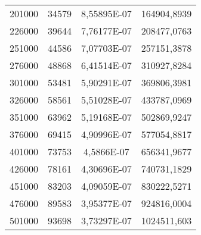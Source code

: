 \documentclass[a4paper,12pt]{article} %
\begin{document}
\begin{table}[H]
{\begin{tabular}{|c|c|c|c|}
			201000                                             & 34579                & 8,55895E-07                 & 164904,8939                                      \\
			226000                                             & 39644                & 7,76177E-07                 & 208477,0763                                      \\
			251000                                             & 44586                & 7,07703E-07                 & 257151,3878                                      \\
			276000                                             & 48868                & 6,41514E-07                 & 310927,8284                                      \\
			301000                                             & 53481                & 5,90291E-07                 & 369806,3981                                      \\
			326000                                             & 58561                & 5,51028E-07                 & 433787,0969                                      \\
			351000                                             & 63962                & 5,19168E-07                 & 502869,9247                                      \\
			376000                                             & 69415                & 4,90996E-07                 & 577054,8817                                      \\
			401000                                             & 73753                & 4,5866E-07                  & 656341,9677                                      \\
			426000                                             & 78161                & 4,30696E-07                 & 740731,1829                                      \\
			451000                                             & 83203                & 4,09059E-07                 & 830222,5271                                      \\
			476000                                             & 89583                & 3,95377E-07                 & 924816,0004                                      \\
			501000                                             & 93698                & 3,73297E-07                 & 1024511,603                                      \\

\end{tabular}}
\end{table}
\end{document}
